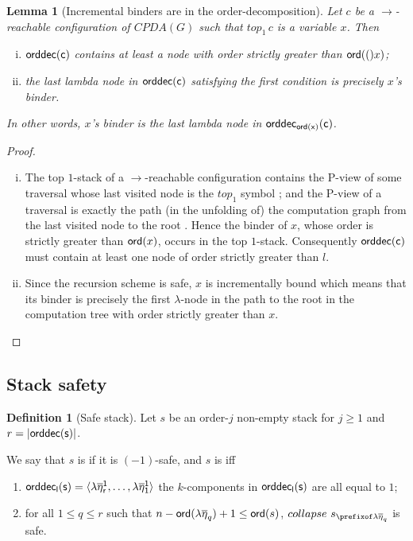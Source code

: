 \documentclass[a4paper]{article}
\newtheorem{lemma}{Lemma}[section]
\theoremstyle{remark}
\theoremstyle{definition}
\newtheorem{definition}{Definition}[section]
\newcommand\orddec{\sf orddec}
\begin{document}
\begin{lemma}[Incremental binders are in the order-decomposition]
\label{lem:binder_in_ordecompos} Let $c$ be a $\rightarrow$-reachable
configuration of $CPDA(G)$ such that $top_1\,c$ is a variable $x$. Then
\begin{enumerate}[i.]
\item $\orddec(c)$ contains at least a node with order strictly greater than ${\sf ord}(()x)$;
\item the last lambda node in $\orddec(c)$ satisfying the first condition is precisely $x$'s binder.
\end{enumerate}
In other words, $x$'s binder is the last lambda node in $\orddec_{\ord x}(c)$.
\end{lemma}
\begin{proof}
\begin{enumerate}[i.]
\item The top $1$-stack of a $\rightarrow$-reachable configuration contains the P-view of some traversal whose last visited node is the $top_1$ symbol \cite[Corollary 8]{hague-collaps-full}; and
    the P-view of a traversal is exactly the path (in the unfolding of) the
    computation graph from the last visited node to
    the root \cite[Proposition 6]{OngLics2006}. Hence the binder of $x$, whose order
    is strictly greater than ${\sf ord}(x)$, occurs in the top $1$-stack.
    Consequently $\orddec(c)$ must contain at least one node of order strictly greater than $l$.

\item Since the recursion scheme is safe, $x$ is
 incrementally bound \cite{blumong:safelambdacalculus}
 which means that its binder is precisely the first $\lambda$-node in the
 path to the root in the computation tree with order strictly
 greater than $x$. \qedhere
\end{enumerate}
\end{proof}

\subsection{Stack safety}

\begin{definition}[Safe stack]
\label{dfn:safestack} Let $s$ be an order-$j$ non-empty stack for $j\geq1$ and $r
= |\orddec(s)|$.

We say that $s$ is  if it is $(-1)$-safe,
and $s$ is  iff
    \begin{enumerate}[1.]
    \item $\orddec_l(s) = \langle \lambda \overline\eta_r^1, \ldots ,
    \lambda \overline{\eta}_1^1 \rangle$ \ie the $k$-components in $\orddec_l(s)$ are all equal to $1$;

    \item for all $1 \leq q \leq r$ such that $n-{\sf ord}(\lambda \overline\eta_q)+1 \leq {\sf ord}(s)$,
    $collapse~s_{\prefixof \lambda\overline\eta_q}$ is safe.
    \end{enumerate}

\end{definition}
\end{document}
